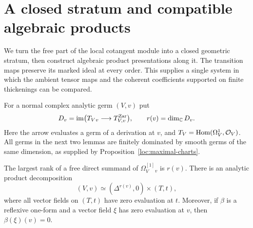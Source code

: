 \section{A closed stratum and compatible algebraic products}\label{sec:stratum}

We turn the free part of the local cotangent module into a closed
geometric stratum, then construct algebraic product presentations along
it.  The transition maps preserve its marked ideal at every order.
This supplies a single system in which the ambient tensor maps and the
coherent coefficients supported on finite thickenings can be compared.

For a normal complex analytic germ $(V,v)$ put
\[
 D_v=\operatorname{im}\bigl(T_V{}_v\longrightarrow T_{V,v}^{\mathrm{Zar}}\bigr),
 \qquad r(v)=\dim_{\mathbb C}D_v.
\]
Here the arrow evaluates a germ of a derivation at $v$, and
$T_V=\operatorname{Hom}(\Omega_V^1,\mathcal O_V)$.  All germs in the next two lemmas are finitely
dominated by smooth germs of the same dimension, as supplied by
Proposition~\ref{loc:maximal-charts}.

\begin{lemma}\label{str:evaluation}
The largest rank of a free direct summand of $\Omega_V^{[1]}{}_v$ is
$r(v)$.  There is an analytic product decomposition
\begin{equation}\label{str:analytic-product}
 (V,v)\simeq(\Delta^{r(v)},0)\times(T,t),
\end{equation}
where all vector fields on $(T,t)$ have zero evaluation at $t$.
Moreover, if $\beta$ is a reflexive one-form and a vector field $\xi$
has zero evaluation at $v$, then $\beta(\xi)(v)=0$.
\end{lemma}

